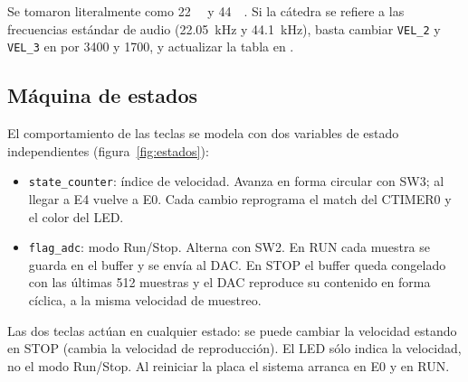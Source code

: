 \documentclass[11pt,a4paper]{article}
\begin{document}
\begin{nota}[Interpretación de 22K/S y 44K/S]
Se tomaron literalmente como \qty{22}{\kilo\sps} y \qty{44}{\kilo\sps}. Si la
cátedra se refiere a las frecuencias estándar de audio
(\qty{22.05}{\kilo\hertz} y \qty{44.1}{\kilo\hertz}), basta cambiar
\texttt{VEL\_2} y \texttt{VEL\_3} en  por 3400 y 1700, y
actualizar la tabla en .
\end{nota}

\subsection{Máquina de estados}

El comportamiento de las teclas se modela con dos variables de estado
independientes (figura~\ref{fig:estados}):

\begin{itemize}[nosep]
  \item \texttt{state\_counter}: índice de velocidad. Avanza en forma
        circular con SW3; al llegar a E4 vuelve a E0. Cada cambio reprograma
        el match del CTIMER0 y el color del LED.
  \item \texttt{flag\_adc}: modo Run/Stop. Alterna con SW2. En RUN cada
        muestra se guarda en el buffer y se envía al DAC. En STOP el buffer
        queda congelado con las últimas 512 muestras y el DAC reproduce su
        contenido en forma cíclica, a la misma velocidad de muestreo.
\end{itemize}

Las dos teclas actúan en cualquier estado: se puede cambiar la velocidad
estando en STOP (cambia la velocidad de reproducción). El LED sólo indica la
velocidad, no el modo Run/Stop. Al reiniciar la placa el sistema arranca en
E0 y en RUN.
\end{document}
